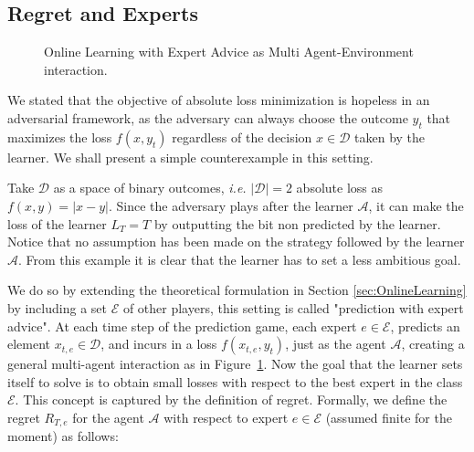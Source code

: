 


\subsection{Regret and Experts}
\begin{figure}[t!]
\centering

\caption{Online Learning with Expert Advice as Multi Agent-Environment interaction.}
\label{fig:OL}
\end{figure}
We stated that the objective of absolute loss minimization is hopeless in an adversarial framework, as the adversary can always choose the outcome $y_t$ that maximizes the loss $f(x,y_t)$ regardless of the decision $x\in\mathcal D$ taken by the learner. We shall present a simple counterexample in this setting.

Take $\mathcal D$ as a space of binary outcomes, \emph{i.e.} $|\mathcal D|=2$ absolute loss as $f(x,y)=|x - y|$. Since the adversary plays after the learner $\mathcal A$, it can  make the loss of the learner $L_T=T$ by outputting the bit non predicted by the learner. Notice that no assumption has been made on the strategy followed by the learner $\mathcal A$.
From this example it is clear that the learner has to set a less ambitious goal.

We do so by extending the theoretical formulation in Section \ref{sec:OnlineLearning} by including a set $\mathcal E$ of other players, this setting is called "prediction with expert advice". At each time step of the prediction game, each expert $e\in\mathcal E$, predicts an element $x_{t,e}\in\mathcal D$, and incurs in a loss $f(x_{t,e},y_t)$, just as the agent $\mathcal A$, creating a general multi-agent interaction as in Figure~\ref{fig:OL}. 
Now the goal that the learner sets itself to solve is to obtain small losses with respect to the best expert in the class $\mathcal E$. This concept is captured by the definition of regret.
Formally, we define the regret $R_{T,e}$ for the agent $\mathcal A$ with respect to expert $e\in\mathcal E$ (assumed finite for the moment) as follows:

